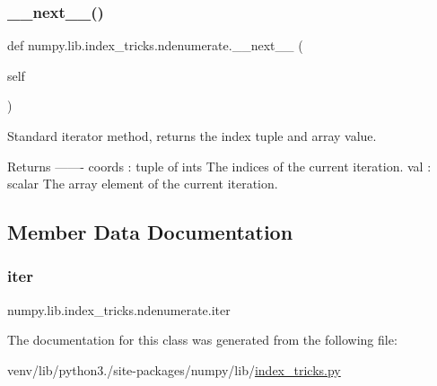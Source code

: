 \mbox{\label{classnumpy_1_1lib_1_1index__tricks_1_1ndenumerate_a3ea340ebbe7bea8e9a1606d6793efc8a}} 
\subsubsection{\texorpdfstring{\+\_\+\+\_\+next\+\_\+\+\_\+()}{\_\_next\_\_()}}
{\footnotesize\ttfamily def numpy.\+lib.\+index\+\_\+tricks.\+ndenumerate.\+\_\+\+\_\+next\+\_\+\+\_\+ (\begin{DoxyParamCaption}\item[{}]{self }\end{DoxyParamCaption})}

\begin{DoxyVerb}Standard iterator method, returns the index tuple and array value.

Returns
-------
coords : tuple of ints
    The indices of the current iteration.
val : scalar
    The array element of the current iteration.\end{DoxyVerb}
 

\subsection{Member Data Documentation}
\mbox{\label{classnumpy_1_1lib_1_1index__tricks_1_1ndenumerate_aa6097b451afd6a607c07b4259d43ecd1}} 
\subsubsection{\texorpdfstring{iter}{iter}}
{\footnotesize\ttfamily numpy.\+lib.\+index\+\_\+tricks.\+ndenumerate.\+iter}



The documentation for this class was generated from the following file\+:\begin{DoxyCompactItemize}
\item 
venv/lib/python3./site-\/packages/numpy/lib/\hyperlink{lib_2index__tricks_8py}{index\+\_\+tricks.\+py}\end{DoxyCompactItemize}

